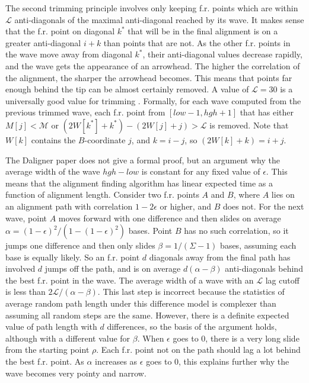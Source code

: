 \documentclass[../main/thesis.tex]{subfiles}
\begin{document}


The second trimming principle involves only keeping f.r. points which are within $\mathcal{L}$ anti-diagonals of the maximal anti-diagonal reached by its wave.
It makes sense that the f.r. point on diagonal $k^*$ that will be in the final alignment is on a greater anti-diagonal $i+k$ than points that are not.
As the other f.r. points in the wave move away from diagonal $k^*$, their anti-diagonal values decrease rapidly, and the wave gets the appearance of an arrowhead.
The higher the correlation of the alignment, the sharper the arrowhead becomes.
This means that points far enough behind the tip can be almost certainly removed.
A value of $\mathcal{L} = 30$ is a universally good value for trimming \cite{Daligner}.
Formally, for each wave computed from the previous trimmed wave, each f.r. point from $[low-1,hgh+1]$ that has either $M[j]<\mathcal{M}$ or $(2W[k^*]+k^*) - (2W[j]+j) > \mathcal{L}$ is removed.
Note that $W[k]$ contains the $B$-coordinate $j$, and $k=i-j$, so $(2W[k]+k) = i+j$.

The Daligner paper does not give a formal proof, but an argument why the average width of the wave $hgh-low$ is constant for any fixed value of $\epsilon$.
This means that the alignment finding algorithm has linear expected time as a function of alignment length.
Consider two f.r. points $A$ and $B$, where $A$ lies on an alignment path with correlation $1-2\epsilon$ or higher, and $B$ does not.
For the next wave, point $A$ moves forward with one difference and then slides on average $\alpha = (1-\epsilon)^2/(1-(1-\epsilon)^2)$ bases.
Point $B$ has no such correlation, so it jumps one difference and then only slides $\beta = 1/(\Sigma-1)$ bases, assuming each base is equally likely.
So an f.r. point $d$ diagonals away from the final path has involved $d$ jumps off the path, and is on average $d(\alpha-\beta)$ anti-diagonals behind the best f.r. point in the wave.
The average width of a wave with an $\mathcal{L}$ lag cutoff is less than $2\mathcal{L}/(\alpha-\beta)$.
This last step is incorrect because the statistics of average random path length under this difference model is complexer than assuming all random steps are the same.
However, there is a definite expected value of path length with $d$ differences, so the basis of the argument holds, although with a different value for $\beta$.
When $\epsilon$ goes to 0, there is a very long slide from the starting point $\rho$.
Each f.r. point not on the path should lag a lot behind the best f.r. point.
As $\alpha$ increases as $\epsilon$ goes to 0, this explains further why the wave becomes very pointy and narrow.
\end{document}
